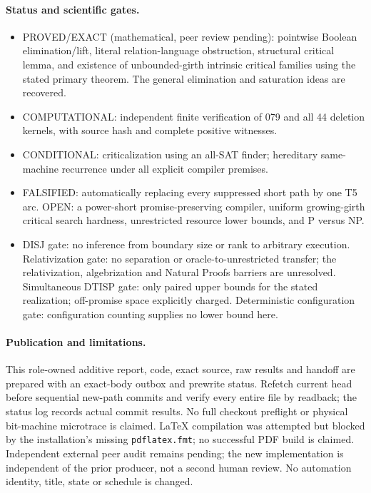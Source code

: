 \documentclass[11pt]{article}
\begin{document}
\paragraph{Status and scientific gates.}
\begin{itemize}
\item PROVED/EXACT (mathematical, peer review pending): pointwise Boolean
elimination/lift, literal relation-language obstruction, structural critical
lemma, and existence of unbounded-girth intrinsic critical families using the
stated primary theorem. The general elimination and saturation ideas are recovered.
\item COMPUTATIONAL: independent finite verification of 079 and all 44
deletion kernels, with source hash and complete positive witnesses.
\item CONDITIONAL: criticalization using an all-SAT finder; hereditary
same-machine recurrence under all explicit compiler premises.
\item FALSIFIED: automatically replacing every suppressed short path by
one T5 arc. OPEN: a power-short promise-preserving compiler, uniform growing-girth
critical search hardness, unrestricted resource lower bounds, and P versus NP.
\item DISJ gate: no inference from boundary size or rank to arbitrary execution.
Relativization gate: no separation or oracle-to-unrestricted transfer; the
relativization, algebrization and Natural Proofs barriers are unresolved.
Simultaneous DTISP gate: only paired upper bounds for the stated realization;
off-promise space explicitly charged. Deterministic configuration gate:
configuration counting supplies no lower bound here.
\end{itemize}

\paragraph{Publication and limitations.}
This role-owned additive report, code, exact source, raw results and handoff
are prepared with an exact-body outbox and prewrite status. Refetch current
head before sequential new-path commits and verify every entire file by
readback; the status log records actual commit results. No full checkout
preflight or physical bit-machine microtrace is claimed. LaTeX compilation was
attempted but blocked by the installation's missing \texttt{pdflatex.fmt}; no
successful PDF build is claimed. Independent external peer audit remains pending; the new
implementation is independent of the prior producer, not a second human review.
No automation identity, title, state or schedule is changed.
\end{document}
